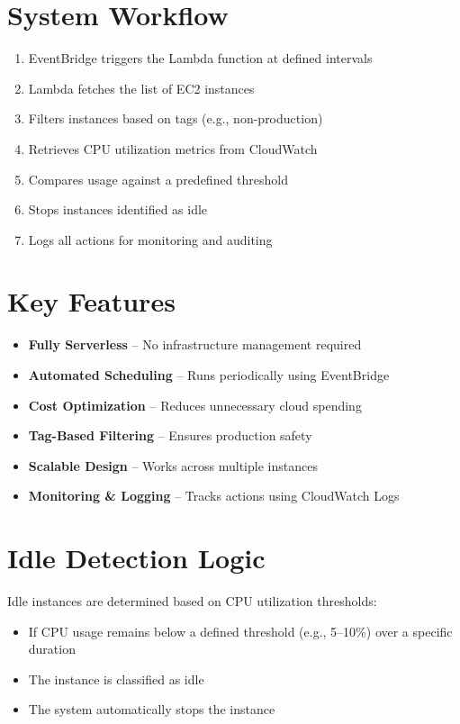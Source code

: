 \documentclass[12pt, a4paper, oneside]{report}
\begin{document}
\section{System Workflow}
\begin{enumerate}[leftmargin=1.5cm]
    \item EventBridge triggers the Lambda function at defined intervals
    \item Lambda fetches the list of EC2 instances
    \item Filters instances based on tags (e.g., non-production)
    \item Retrieves CPU utilization metrics from CloudWatch
    \item Compares usage against a predefined threshold
    \item Stops instances identified as idle
    \item Logs all actions for monitoring and auditing
\end{enumerate}

\section{Key Features}
\begin{itemize}[leftmargin=1.5cm]
    \item \textbf{Fully Serverless} -- No infrastructure management required
    \item \textbf{Automated Scheduling} -- Runs periodically using EventBridge
    \item \textbf{Cost Optimization} -- Reduces unnecessary cloud spending
    \item \textbf{Tag-Based Filtering} -- Ensures production safety
    \item \textbf{Scalable Design} -- Works across multiple instances
    \item \textbf{Monitoring \& Logging} -- Tracks actions using CloudWatch Logs
\end{itemize}

\section{Idle Detection Logic}
Idle instances are determined based on CPU utilization thresholds:
\begin{itemize}[leftmargin=1.5cm]
    \item If CPU usage remains below a defined threshold (e.g., 5--10\%) over a specific duration
    \item The instance is classified as idle
    \item The system automatically stops the instance
\end{itemize}
\end{document}
